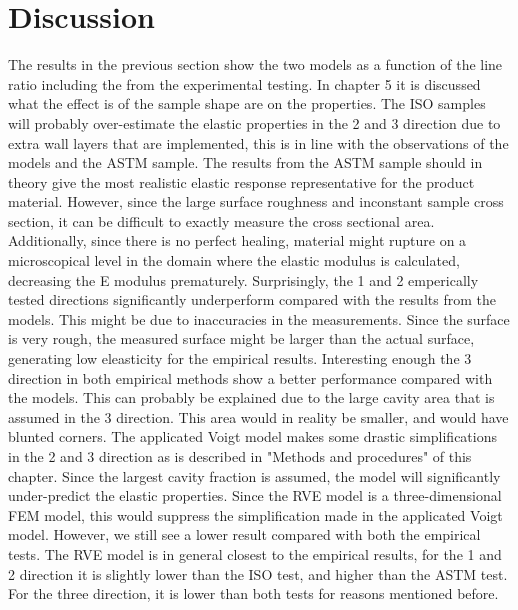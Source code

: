 \section{Discussion}
The results in the previous section show the two models as a function of the line ratio including the from the experimental testing. In chapter 5 it is discussed what the effect is of the sample shape are on the properties. The ISO samples will probably over-estimate the elastic properties in the 2 and 3 direction due to extra wall layers that are implemented, this is in line with the observations of the models and the ASTM sample. The results from the ASTM sample should in theory give the most realistic elastic response representative for the product material. However, since the large surface roughness and inconstant sample cross section, it can be difficult to exactly measure the cross sectional area. Additionally, since there is no perfect healing, material might rupture on a microscopical level in the domain where the elastic modulus is calculated, decreasing the E modulus prematurely.  Surprisingly, the 1 and 2 emperically tested directions significantly underperform compared with the results from the models. This might be due to inaccuracies in the measurements. Since the surface is very rough, the measured surface might be larger than the actual surface, generating low eleasticity for the empirical results. Interesting enough the 3 direction in both empirical methods show a better performance compared with the models. This can probably be explained due to the large cavity area that is assumed in the 3 direction. This area would in reality be smaller, and would have blunted corners. 
The applicated Voigt model makes some drastic simplifications in the 2 and 3 direction as is described in "Methods and procedures" of this chapter. Since the largest cavity fraction is assumed, the model will significantly under-predict the elastic properties. Since the RVE model is a three-dimensional FEM model, this would suppress the simplification made in the applicated Voigt model. However, we still see a lower result compared with both the empirical tests. The RVE model is in general closest to the empirical results, for the 1 and 2 direction it is slightly lower than the ISO test, and higher than the ASTM test. For the three direction, it is lower than both tests for reasons mentioned before.

